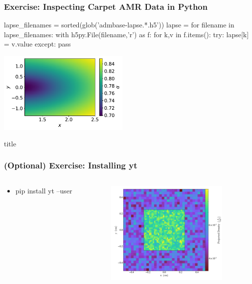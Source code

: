 \documentclass[]{beamer}
\newcommand{\transitionslide}[1]{
  \begin{frame}[plain]
  \vfill
  \centering
  \begin{beamercolorbox}[sep=8pt,center,shadow=true,rounded=true]{title}
    \usebeamerfont{title}{#1}
  \end{beamercolorbox}
  \vfill
\end{frame}
}
\begin{document}
\begin{frame}[fragile]
  \frametitle{Exercise: Inspecting Carpet AMR Data in Python}
  \begin{python}
lapse_filenames = sorted(glob('admbase-lapse.*.h5'))
lapse = {}
for filename in lapse_filenames:
    with h5py.File(filename,'r') as f:
        for k,v in f.items():
            try:
                lapse[k] = v.value
            except:
                pass
  \end{python}
  \begin{center}
    \includegraphics[height=4cm]{figures/lapse2d}
  \end{center}
\end{frame}

\transitionslide{yt}

\begin{frame}
  \frametitle{(Optional) Exercise: Installing yt}
  \begin{columns}
    \begin{column}{6cm}
      \begin{itemize}
      \item  pip install yt --user
      \end{itemize}
    \end{column}
    \begin{column}{6cm}
      \includegraphics[width=6cm]{figures/yt-rand}
    \end{column}
  \end{columns}
\end{frame}
\end{document}
